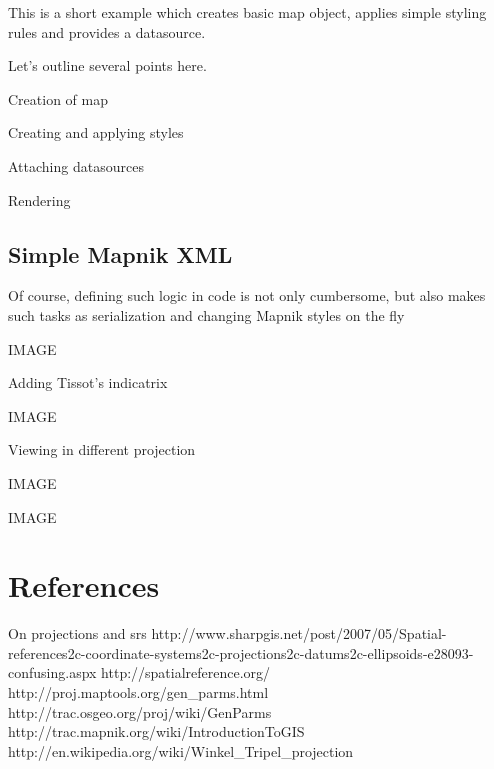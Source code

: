 \documentclass{article}
\begin{document}
This is a short example which creates basic map object, applies simple styling
rules and provides a datasource.



Let's outline several points here.

Creation of map

Creating and applying styles

Attaching datasources

Rendering

\subsection{Simple Mapnik XML}

Of course, defining such logic in code is not only cumbersome, but also makes
such tasks as serialization and changing Mapnik styles on the fly



IMAGE

Adding Tissot's indicatrix



IMAGE

Viewing in different projection



IMAGE



IMAGE



\section{References}

On projections and srs
http://www.sharpgis.net/post/2007/05/Spatial-references2c-coordinate-systems2c-projections2c-datums2c-ellipsoids-e28093-confusing.aspx
http://spatialreference.org/
http://proj.maptools.org/gen_parms.html
http://trac.osgeo.org/proj/wiki/GenParms
http://trac.mapnik.org/wiki/IntroductionToGIS
http://en.wikipedia.org/wiki/Winkel_Tripel_projection
\end{document}
